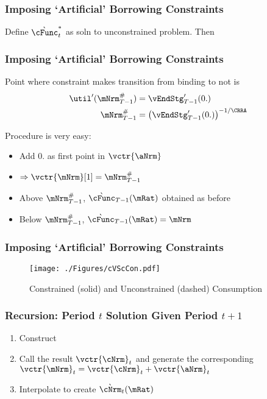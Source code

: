\documentclass{beamer}
\begin{document}
\begin{frame}
\frametitle{Imposing `Artificial' Borrowing Constraints}


\pause 

Define $\grave{\cFunc}^{*}_{t}$ as soln to unconstrained problem.  Then


\end{frame}

\begin{frame}
\frametitle{Imposing `Artificial' Borrowing Constraints}

Point where constraint makes transition from binding to not is
\begin{equation*}\begin{gathered}\begin{aligned}
    \util^{\prime}(\mNrm_{T-1}^{\#})  & = \vEndStg^{\prime}_{T-1}(0.)
\\  \mNrm_{T-1}^{\#}  & = \left(\vEndStg^{\prime}_{T-1}(0.)\right)^{-1/\CRRA}
\end{aligned}\end{gathered}\end{equation*}
\pause\medskip

Procedure is very easy:
\begin{itemize}
\item Add $0.$ as first point in $\vctr{\aNrm}$
\item $\Rightarrow \vctr{\mNrm}[1] = \mNrm_{T-1}^{\#}$
\item Above $\mNrm_{T-1}^{\#}$, $\grave{\cFunc}_{T-1}(\mRat)$ obtained as before
\item Below $\mNrm_{T-1}^{\#}$, $\grave{\cFunc}_{T-1}(\mRat)=\mNrm$
\end{itemize}

\end{frame}

\begin{frame}
\frametitle{Imposing `Artificial' Borrowing Constraints}
\begin{figure}
\texttt{[image: ./Figures/cVScCon.pdf]}
        \caption{Constrained (solid) and Unconstrained (dashed) Consumption}
        \label{fig:cVScCon}
\end{figure}

\end{frame}

\begin{frame}%
\frametitle{Recursion: Period $t$ Solution Given Period $t+1$}
\begin{enumerate}
\item Construct 

\item Call the result $\vctr{\cNrm}_{t}$ and generate the corresponding $\vctr{\mNrm}_{t}=\vctr{\cNrm}_{t}+\vctr{\aNrm}_{t}$
\item Interpolate to create $\grave{\cNrm}_{t}(\mRat)$
\end{enumerate}

\end{frame}
\end{document}

